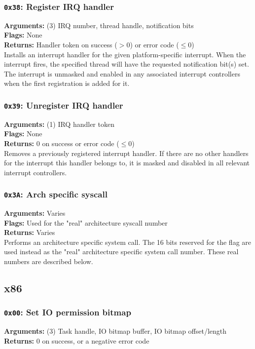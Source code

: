 \documentclass[11pt]{article}
\begin{document}
\subsubsection{{\tt 0x38}: Register IRQ handler}
\textbf{Arguments:} (3) IRQ number, thread handle, notification bits \\
\textbf{Flags:} None \\
\textbf{Returns:} Handler token on success ($> 0$) or error code ($\leq0$) \\

Installs an interrupt handler for the given platform-specific interrupt. When the interrupt fires, the specified thread will have the requested notification bit(s) set. The interrupt is unmasked and enabled in any associated interrupt controllers when the first registration is added for it.

\subsubsection{{\tt 0x39}: Unregister IRQ handler}
\textbf{Arguments:} (1) IRQ handler token \\
\textbf{Flags:} None \\
\textbf{Returns:} 0 on success or error code ($\leq0$) \\

Removes a previously registered interrupt handler. If there are no other handlers for the interrupt this handler belongs to, it is masked and disabled in all relevant interrupt controllers. 

\subsubsection{{\tt 0x3A}: Arch specific syscall}
\textbf{Arguments:} Varies \\
\textbf{Flags:} Used for the "real" architecture syscall number \\
\textbf{Returns:} Varies \\

Performs an architecture specific system call. The 16 bits reserved for the flag are used instead as the "real" architecture specific system call number. These real numbers are described below.

\subsection{x86}
\subsubsection{{\tt 0x00}: Set IO permission bitmap}
\textbf{Arguments:} (3) Task handle, IO bitmap buffer, IO bitmap offset/length \\
\textbf{Returns:} 0 on success, or a negative error code \\
\end{document}
